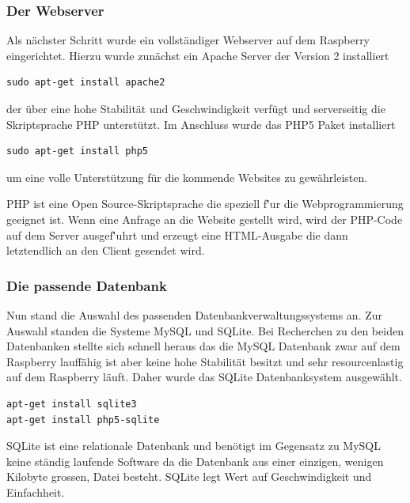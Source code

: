 \documentclass[11pt,a4paper]{article} %
\begin{document}
\subsubsection{Der Webserver}
Als n\"achster Schritt wurde ein vollst\"andiger Webserver auf dem Raspberry eingerichtet. Hierzu wurde zun\"achst ein Apache Server der Version 2 installiert
\begin{frame}

\begin{lstlisting}
sudo apt-get install apache2
\end{lstlisting}

\end{frame}
 der \"uber eine hohe Stabilit\"at und Geschwindigkeit verf\"ugt und serverseitig die Skriptsprache PHP unterst\"utzt. Im Anschluss wurde das PHP5 Paket installiert
 \begin{frame}

\begin{lstlisting}
sudo apt-get install php5
\end{lstlisting}

\end{frame}
 um eine volle Unterst\"utzung f\"ur die kommende Websites zu gew\"ahrleisten.
 \par
 PHP ist eine Open Source-Skriptsprache die speziell f\''ur die Webprogrammierung geeignet ist. Wenn eine Anfrage an die Website gestellt wird, wird der PHP-Code auf dem Server ausgef\''uhrt und erzeugt eine HTML-Ausgabe die dann letztendlich an den Client gesendet wird.
\par
\subsubsection{Die passende Datenbank}
Nun stand die Auswahl des passenden Datenbankverwaltungssystems an. Zur Auswahl standen die Systeme MySQL und SQLite. Bei Recherchen zu den beiden Datenbanken stellte sich schnell heraus das die MySQL Datenbank zwar auf dem Raspberry lauff\"ahig ist aber keine hohe Stabilit\"at besitzt und sehr resourcenlastig auf dem Raspberry l\"auft. Daher wurde das SQLite Datenbanksystem ausgew\"ahlt.
\begin{frame}

\begin{lstlisting}
apt-get install sqlite3
apt-get install php5-sqlite
\end{lstlisting}

\end{frame}
 SQLite ist eine relationale Datenbank und ben\"otigt im Gegensatz zu MySQL keine st\"andig laufende Software da die Datenbank aus einer einzigen, wenigen Kilobyte grossen, Datei besteht. SQLite  legt Wert auf Geschwindigkeit und Einfachheit.
\par
\end{document}
